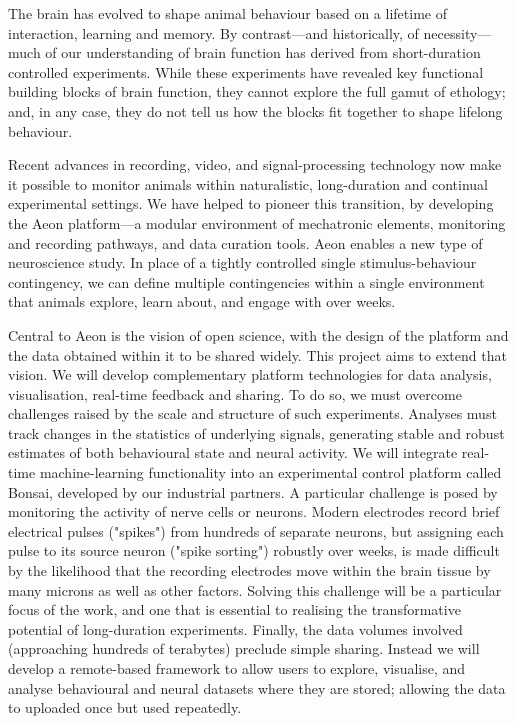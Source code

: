 The brain has evolved to shape animal behaviour based on a lifetime of
interaction, learning and memory.  By contrast—and historically, of
necessity—much of our understanding of brain function has derived from
short-duration controlled experiments. While these experiments have revealed
key functional building blocks of brain function, they cannot explore the full
gamut of ethology; and, in any case, they do not tell us how the blocks fit
together to shape lifelong behaviour.

Recent advances in recording, video, and signal-processing technology now make
it possible to monitor animals within naturalistic, long-duration and continual
experimental settings. We have helped to pioneer this transition, by developing
the Aeon platform—a modular environment of mechatronic elements, monitoring and
recording pathways, and data curation tools.  Aeon enables a new type of
neuroscience study. In place of a tightly controlled single stimulus-behaviour
contingency, we can define multiple contingencies within a single environment
that animals explore, learn about, and engage with over weeks.

Central to Aeon is the vision of open science, with the design of the platform
and the data obtained within it to be shared widely.  This project aims to
extend that vision.  We will develop complementary platform technologies for
data analysis, visualisation, real-time feedback and sharing.  To do so, we
must overcome challenges raised by the scale and structure of such experiments.
Analyses must track changes in the statistics of underlying signals, generating
stable and robust estimates of both behavioural state and neural activity.  We
will integrate real-time machine-learning functionality into an experimental
control platform called Bonsai, developed by our industrial partners.  A
particular challenge is posed by monitoring the activity of nerve cells or
neurons.  Modern electrodes record brief electrical pulses ("spikes") from
hundreds of separate neurons, but assigning each pulse to its source neuron
("spike sorting") robustly over weeks, is made difficult by the likelihood that
the recording electrodes move within the brain tissue by many microns as well
as other factors.  Solving this challenge will be a particular focus of the
work, and one that is essential to realising the transformative potential of
long-duration experiments.  Finally, the data volumes involved (approaching
hundreds of terabytes) preclude simple sharing.  Instead we will develop a
remote-based framework to allow users to explore, visualise, and analyse
behavioural and neural datasets where they are stored; allowing the data to
uploaded once but used repeatedly.

